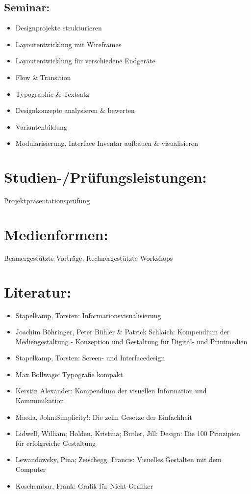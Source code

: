 \subsection*{Seminar:}\label{seminar}

\begin{itemize}
\item
  Designprojekte strukturieren
\item
  Layoutentwicklung mit Wireframes
\item
  Layoutentwicklung für verschiedene Endgeräte
\item
  Flow \& Transition
\item
  Typographie \& Textsatz
\item
  Designkonzepte analysieren \& bewerten
\item
  Variantenbildung
\item
  Modularisierung, Interface Inventar aufbauen \& visualisieren
\end{itemize}

\section*{Studien-/Prüfungsleistungen:}\label{studien-pruxfcfungsleistungen-20}

Projektpräsentationsprüfung

\section*{Medienformen:}\label{medienformen-14}

Beamergestützte Vorträge, Rechnergestützte Workshops

\section*{Literatur:}\label{literatur-21}

\begin{itemize}
\item
  Stapelkamp, Torsten: Informationsvisualisierung
\item
  Joachim Böhringer, Peter Bühler \& Patrick Schlaich: Kompendium der
  Mediengestaltung - Konzeption und Gestaltung für Digital- und
  Printmedien
\item
  Stapelkamp, Torsten: Screen- und Interfacedesign
\item
  Max Bollwage: Typografie kompakt
\item
  Kerstin Alexander: Kompendium der visuellen Information und
  Kommunikation
\item
  Maeda, John:Simplicity!: Die zehn Gesetze der Einfachheit
\item
  Lidwell, William; Holden, Kristina; Butler, Jill: Design: Die 100
  Prinzipien für erfolgreiche Gestaltung
\item
  Lewandowsky, Pina; Zeischegg, Francis: Visuelles Gestalten mit dem
  Computer
\item
  Koschembar, Frank: Grafik für Nicht-Grafiker
\end{itemize}

